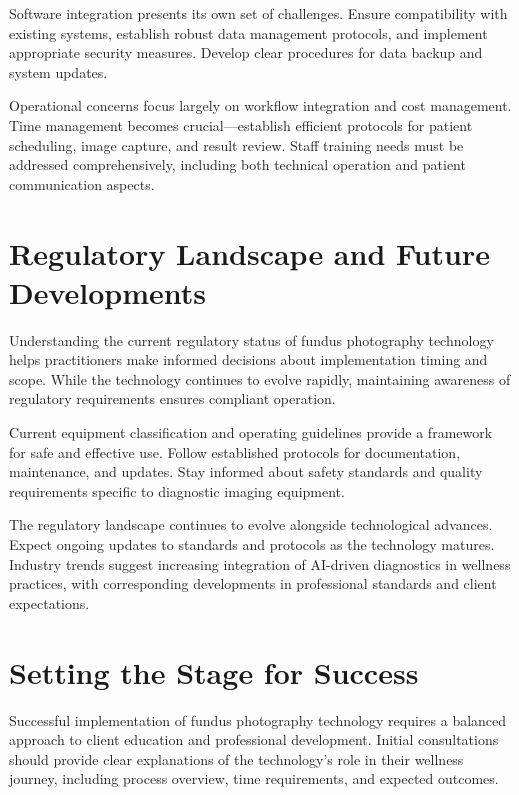 \documentclass[
  Letterpaper,
]{scrbook}
\begin{document}
Software integration presents its own set of challenges. Ensure
compatibility with existing systems, establish robust data management
protocols, and implement appropriate security measures. Develop clear
procedures for data backup and system updates.

Operational concerns focus largely on workflow integration and cost
management. Time management becomes crucial---establish efficient
protocols for patient scheduling, image capture, and result review.
Staff training needs must be addressed comprehensively, including both
technical operation and patient communication aspects.

\section{Regulatory Landscape and Future
Developments}\label{regulatory-landscape-and-future-developments}

Understanding the current regulatory status of fundus photography
technology helps practitioners make informed decisions about
implementation timing and scope. While the technology continues to
evolve rapidly, maintaining awareness of regulatory requirements ensures
compliant operation.

Current equipment classification and operating guidelines provide a
framework for safe and effective use. Follow established protocols for
documentation, maintenance, and updates. Stay informed about safety
standards and quality requirements specific to diagnostic imaging
equipment.

The regulatory landscape continues to evolve alongside technological
advances. Expect ongoing updates to standards and protocols as the
technology matures. Industry trends suggest increasing integration of
AI-driven diagnostics in wellness practices, with corresponding
developments in professional standards and client expectations.

\section{Setting the Stage for
Success}\label{setting-the-stage-for-success}

Successful implementation of fundus photography technology requires a
balanced approach to client education and professional development.
Initial consultations should provide clear explanations of the
technology's role in their wellness journey, including process overview,
time requirements, and expected outcomes.
\end{document}

